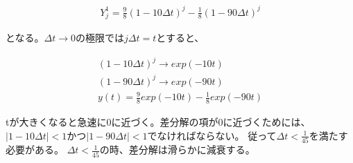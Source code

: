 \documentclass[]{jsarticle}
\begin{document}
\begin{eqnarray*}
Y_{j}^{1} = \frac{9}{8} ( 1-10 \Delta t)^{j} - \frac{1}{8} ( 1- 90\Delta t)^{j} 
\end{eqnarray*}

となる。$\Delta t \to 0$の極限では$j\Delta t = t$とすると、

\begin{eqnarray*}
(1-10 \Delta t)^{j} \to exp(-10t)\\
(1-90 \Delta t)^{j} \to exp(-90t)\\
y(t) = \frac{9}{8} exp(-10t) - \frac{1}{8} exp (-90t)
\end{eqnarray*}

tが大きくなると急速に0に近づく。差分解の項が0に近づくためには、$|1 - 10 \Delta t| < 1$かつ$|1 - 90 \Delta t| < 1$でなければならない。
従って$\Delta t < \frac{1}{45}$を満たす必要がある。
$\Delta t < \frac{1}{45}$の時、差分解は滑らかに減衰する。
\end{document}
